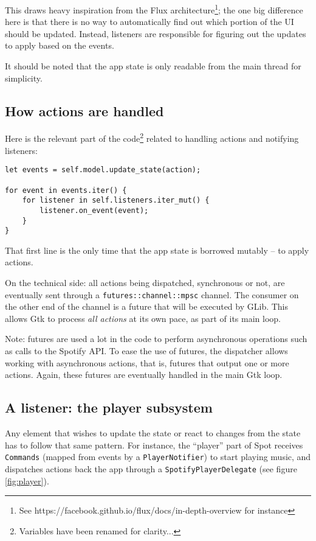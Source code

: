 \documentclass[12pt, a4paper]{article}
\begin{document}
This draws heavy inspiration from the Flux architecture\footnote{See https://facebook.github.io/flux/docs/in-depth-overview for instance}; the one big difference here is that there is no way to automatically find out which portion of the UI should be updated. Instead, listeners are responsible for figuring out the updates to apply based on the events.

It should be noted that the app state is only readable from the main thread for simplicity.

\subsection{How actions are handled}

Here is the relevant part of the code\footnote{Variables have been renamed for clarity...} related to handling actions and notifying listeners:

\begin{verbatim}
let events = self.model.update_state(action);

for event in events.iter() {
    for listener in self.listeners.iter_mut() {
        listener.on_event(event);
    }
}
\end{verbatim}

That first line is the only time that the app state is borrowed mutably -- to apply actions.

On the technical side: all actions being dispatched, synchronous or not, are eventually sent through a \texttt{futures::channel::mpsc} channel. The consumer on the other end of the channel is a future that will be executed by GLib. This allows Gtk to process \emph{all actions} at its own pace, as part of its main loop.

Note: futures are used a lot in the code to perform asynchronous operations such as calls to the Spotify API. To ease the use of futures, the dispatcher allows working with asynchronous actions, that is, futures that output one or more actions. Again, these futures are eventually handled in the main Gtk loop.

\subsection{A listener: the player subsystem}

Any element that wishes to update the state or react to changes from the state has to follow that same pattern. For instance, the ``player'' part of Spot receives \texttt{Commands} (mapped from events by a \texttt{PlayerNotifier}) to start playing music, and dispatches actions back the app through a \texttt{SpotifyPlayerDelegate} (see figure \ref{fig:player}).
\end{document}
